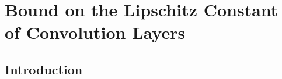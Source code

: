 \chapter{Bound on the Lipschitz Constant of Convolution Layers}
\label{chapter:ch5-lipschitz_bound}
\localtoc


\section{Introduction}
\label{section:ch5-introduction}


%

